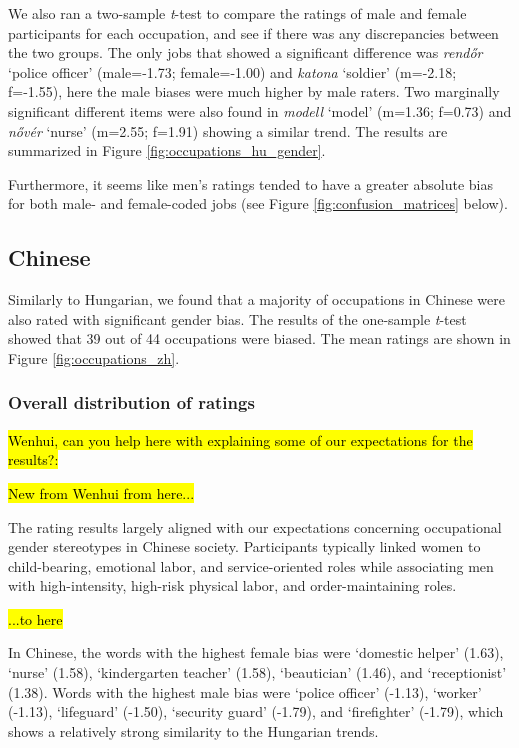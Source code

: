 \documentclass[11pt]{article}
\newcommand{\zh}[1]{\simplifiedchinesefont{#1}\rmfamily}
\begin{document}
We also ran a two-sample \textit{t}-test to compare the ratings of male and female participants for each occupation, and see if there was any discrepancies between the two groups. The only jobs that showed a significant difference was \textit{rendőr} `police officer' (male=-1.73; female=-1.00) and \textit{katona} `soldier' (m=-2.18; f=-1.55), here the male biases were much higher by male raters. Two marginally significant different items were also found in \textit{modell} `model' (m=1.36; f=0.73) and \textit{nővér} `nurse' (m=2.55; f=1.91) showing a similar trend. The results are summarized in Figure \ref{fig:occupations_hu_gender}.

Furthermore, it seems like men's ratings tended to have a greater absolute bias for both male- and female-coded jobs (see Figure \ref{fig:confusion_matrices} below).


\subsection{Chinese}

Similarly to Hungarian, we found that a majority of occupations in Chinese were also rated with significant gender bias. The results of the one-sample \textit{t}-test showed that 39 out of 44 occupations were biased. The mean ratings are shown in Figure \ref{fig:occupations_zh}.

\subsubsection{Overall distribution of ratings}

\hl{Wenhui, can you help here with explaining some of our expectations for the results?:}

\hl{New from Wenhui from here...}

The rating results largely aligned with our expectations concerning occupational gender stereotypes in Chinese society. Participants typically linked women to child-bearing, emotional labor, and service-oriented roles while associating men with high-intensity, high-risk physical labor, and order-maintaining roles.

\hl{...to here}

In Chinese, the words with the highest female bias were \zh{保姆} `domestic helper' (1.63), \zh{护士} `nurse' (1.58), \zh{幼师} `kindergarten teacher' (1.58), \zh{美容师} `beautician' (1.46), and \zh{前台} `receptionist' (1.38). Words with the highest male bias were \zh{警察} `police officer' (-1.13), \zh{工人} `worker' (-1.13), \zh{救生员} `lifeguard' (-1.50), \zh{保安} `security guard' (-1.79), and \zh{消防员} `firefighter' (-1.79), which shows a relatively strong similarity to the Hungarian trends.
\end{document}
